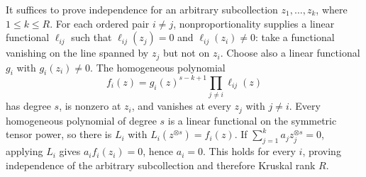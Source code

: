 It suffices to prove independence for an arbitrary subcollection \(z_1,\ldots,z_k\), where \(1\le k\le R\). For each ordered pair \(i\ne j\), nonproportionality supplies a linear functional \(\ell_{ij}\) such that \(\ell_{ij}(z_j)=0\) and \(\ell_{ij}(z_i)\ne0\): take a functional vanishing on the line spanned by \(z_j\) but not on \(z_i\). Choose also a linear functional \(g_i\) with \(g_i(z_i)\ne0\). The homogeneous polynomial
\[
 f_i(z)=g_i(z)^{s-k+1}\prod_{j\ne i}\ell_{ij}(z)
\]
has degree \(s\), is nonzero at \(z_i\), and vanishes at every \(z_j\) with \(j\ne i\). Every homogeneous polynomial of degree \(s\) is a linear functional on the symmetric tensor power, so there is \(L_i\) with \(L_i(z^{\otimes s})=f_i(z)\). If \(\sum_{j=1}^k a_jz_j^{\otimes s}=0\), applying \(L_i\) gives \(a_if_i(z_i)=0\), hence \(a_i=0\). This holds for every \(i\), proving independence of the arbitrary subcollection and therefore Kruskal rank \(R\).